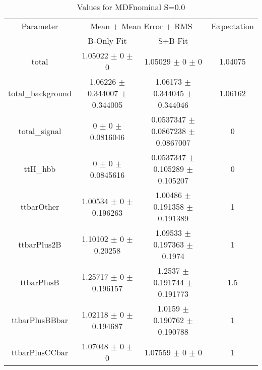 \begin{table}
\centering
\caption{Values for MDFnominal S=0.0}
\begin{tabular}{cccc}
\toprule
Parameter & \multicolumn{2}{c}{Mean $\pm$ Mean Error $\pm$ RMS} & Expectation\\
 & B-Only Fit & S+B Fit & \\
\midrule
total & \num{1.05022} $\pm$ \num{0} $\pm$ \num{0} & \num{1.05029} $\pm$ \num{0} $\pm$ \num{0} & \num{1.04075}\\
total\_background & \num{1.06226} $\pm$ \num{0.344007} $\pm$ \num{0.344005} & \num{1.06173} $\pm$ \num{0.344045} $\pm$ \num{0.344046} & \num{1.06162}\\
total\_signal & \num{0} $\pm$ \num{0} $\pm$ \num{0.0816046} & \num{0.0537347} $\pm$ \num{0.0867238} $\pm$ \num{0.0867007} & \num{0}\\
ttH\_hbb & \num{0} $\pm$ \num{0} $\pm$ \num{0.0845616} & \num{0.0537347} $\pm$ \num{0.105289} $\pm$ \num{0.105207} & \num{0}\\
ttbarOther & \num{1.00534} $\pm$ \num{0} $\pm$ \num{0.196263} & \num{1.00486} $\pm$ \num{0.191358} $\pm$ \num{0.191389} & \num{1}\\
ttbarPlus2B & \num{1.10102} $\pm$ \num{0} $\pm$ \num{0.20258} & \num{1.09533} $\pm$ \num{0.197363} $\pm$ \num{0.1974} & \num{1}\\
ttbarPlusB & \num{1.25717} $\pm$ \num{0} $\pm$ \num{0.196157} & \num{1.2537} $\pm$ \num{0.191744} $\pm$ \num{0.191773} & \num{1.5}\\
ttbarPlusBBbar & \num{1.02118} $\pm$ \num{0} $\pm$ \num{0.194687} & \num{1.0159} $\pm$ \num{0.190762} $\pm$ \num{0.190788} & \num{1}\\
ttbarPlusCCbar & \num{1.07048} $\pm$ \num{0} $\pm$ \num{0} & \num{1.07559} $\pm$ \num{0} $\pm$ \num{0} & \num{1}\\
\bottomrule
\end{tabular}
\end{table}